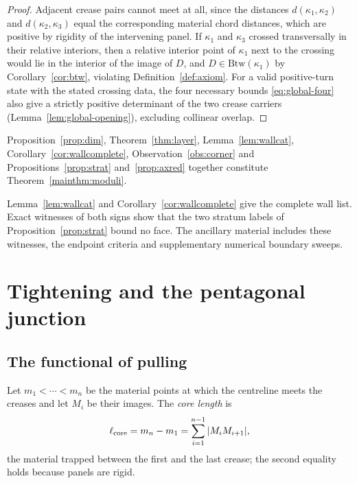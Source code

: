 \begin{proof}
Adjacent crease pairs cannot meet at all, since the distances $d(\kappa_1,\kappa_2)$ and $d(\kappa_2,\kappa_3)$ equal the corresponding material chord distances, which are positive by rigidity of the intervening panel. If $\kappa_1$ and $\kappa_3$ crossed transversally in their relative interiors, then a relative interior point of $\kappa_1$ next to the crossing would lie in the interior of the image of $D$, and $D\in\mathrm{Btw}(\kappa_1)$ by Corollary~\ref{cor:btw}, violating Definition~\ref{def:axiom}. For a valid positive-turn state with the stated crossing data, the four necessary bounds \eqref{eq:global-four} also give a strictly positive determinant of the two crease carriers (Lemma~\ref{lem:global-opening}), excluding collinear overlap.
\end{proof}

Proposition~\ref{prop:dim}, Theorem~\ref{thm:layer}, Lemma~\ref{lem:wallcat}, Corollary~\ref{cor:wallcomplete}, Observation~\ref{obs:corner} and Propositions~\ref{prop:strat} and~\ref{prop:axred} together constitute Theorem~\ref{mainthm:moduli}.

\begin{remark}\label{rem:wallsnum}
Lemma~\ref{lem:wallcat} and Corollary~\ref{cor:wallcomplete} give the complete wall list. Exact witnesses of both signs show that the two stratum labels of Proposition~\ref{prop:strat} bound no face. The ancillary material \cite{anc} includes these witnesses, the endpoint criteria and supplementary numerical boundary sweeps.
\end{remark}

\section{Tightening and the pentagonal junction}\label{sec:tightening}

\subsection{The functional of pulling}

\begin{definition}\label{def:core}
Let $m_1<\cdots<m_n$ be the material points at which the centreline meets the creases and let $M_i$ be their images. The \emph{core length} is
\[
  \ell_{\mathrm{core}}=m_n-m_1=\sum_{i=1}^{n-1}|M_iM_{i+1}| ,
\]
the material trapped between the first and the last crease; the second equality holds because panels are rigid.
\end{definition}

